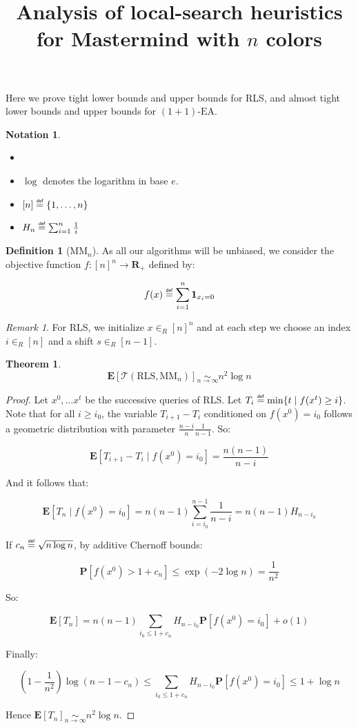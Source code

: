 \documentclass[12pt]{article}
\title{Analysis of local-search heuristics for Mastermind with $n$ colors}
\author{}
\date{}
\theoremstyle{definition}
\newtheorem*{definition}{Definition}
\newtheorem*{notation}{Notation}
\theoremstyle{plain}
\newtheorem*{theorem}{Theorem}
\theoremstyle{remark}
\newtheorem*{remark}{Remark}
\newcommand{\myequiv}[1]{\underset{#1}{\sim}}
\newcommand\mydef{\mathrel{\overset{\makebox[0pt]{\mbox{\normalfont\tiny\sffamily def}}}{=}}}
\begin{document}
\maketitle

Here we prove tight lower bounds and upper bounds for RLS, and almost tight lower bounds and
upper bounds for $(1+1)\text{-EA}$.

\begin{notation}
    \begin{itemize}
        \item[]
        \item $\log$ denotes the logarithm in base $e$.
        \item $[n]\mydef \{1,\ldots,n\}$
        \item $H_n\mydef \sum_{i=1}^n \frac{1}{i}$
    \end{itemize}
\end{notation}

\begin{definition}[$\text{MM}_n$]
    As all our algorithms will be unbiased, we consider the objective function $f:[n]^n\to \mathbf{R}_+$ defined by:

    $$f(x)\mydef \sum_{i=1}^{n} \mathbf{1}_{x_i=0}$$
\end{definition}

\begin{remark}
    For RLS, we initialize $x\in_R [n]^n$ and at each step we choose an index
    $i\in_R [n]$ and a shift $s\in_R [n-1]$.
\end{remark}


\begin{theorem}
    $$\mathbf{E}[\mathcal{T}(\text{RLS},\text{MM}_n)]\myequiv{n\to\infty} n^2 \log n$$
\end{theorem}

\begin{proof}
    Let $x^0, \ldots x^t$ be the successive queries of RLS.
    Let $T_i\mydef \min\{t\mid f(x^t)\ge i\}$. Note that for all $i\ge i_0$, the
    variable $T_{i+1}-T_i$ conditioned on $f(x^0)=i_0$ follows a geometric distribution
    with parameter $\frac{n-i}{n}\frac{1}{n-1}$. So:

    $$\mathbf{E}[T_{i+1}-T_i\mid f(x^0)=i_0]=\frac{n(n-1)}{n-i}$$
    
    And it follows that:
    
    $$\mathbf{E}[T_{n}\mid f(x^0)=i_0]=n(n-1)\sum_{i=i_0}^{n-1} \frac{1}{n-i}=n(n-1)H_{n-i_0}$$

    If $c_n\mydef \sqrt{n\log n}$, by additive Chernoff bounds:

    $$\mathbf{P}[f(x^0)> 1+c_n]\le \exp(-2\log n)=\frac{1}{n^2}$$

    So:

    $$\mathbf{E}[T_n]=n(n-1)\sum_{i_0\le 1+c_n} H_{n-i_0} \mathbf{P}[f(x^0)=i_0]+o(1)$$

    Finally:

    $$\left(1-\frac{1}{n^2}\right)\log(n-1-c_n)\le \sum_{i_0\le 1+c_n} H_{n-i_0} \mathbf{P}[f(x^0)=i_0]\le 1+\log n$$
    
    Hence $\mathbf{E}[T_n]\myequiv{n\to\infty} n^2\log n$.\qedhere

\end{proof}
\end{document}
